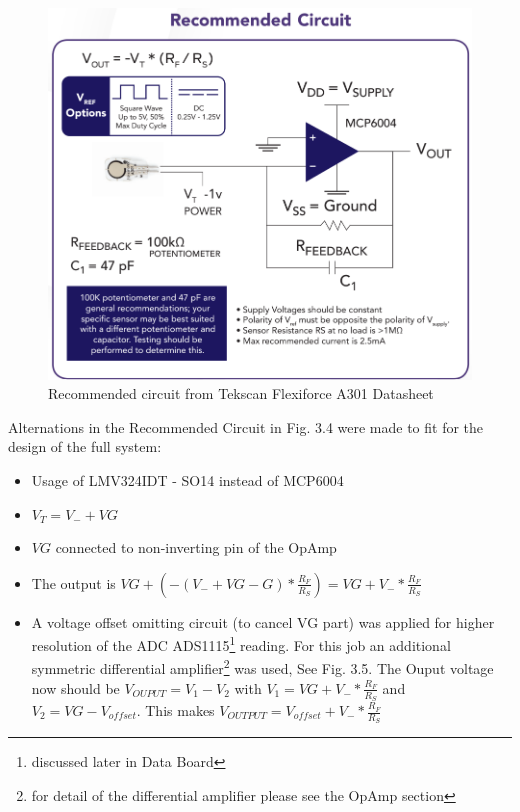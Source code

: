 \documentclass[12 pt, a4paper]{thesis}
\begin{document}
\begin{figure}[hbt!]
\begin{center}
\includegraphics[width = 150mm]{FlexA301Cir.png}
\end{center}
\caption{Recommended circuit from Tekscan Flexiforce A301 Datasheet}
\end{figure}
Alternations in the Recommended Circuit in Fig. 3.4 were made to fit for the design of the full system:
\begin{itemize}
\item{Usage of LMV324IDT - SO14 instead of MCP6004}
\item{$V_T = V_- + VG$}
\item{$VG$ connected to non-inverting pin of the OpAmp}
\item{The output is $VG+(-(V_- + VG - G)*\frac{R_F}{R_S})=VG+V_-*\frac{R_F}{R_S}$}
\item{A voltage offset omitting circuit (to cancel VG part) was applied for higher resolution of the ADC ADS1115\footnote{discussed later in Data Board} reading. For this job an additional symmetric differential amplifier\footnote{for detail of the differential amplifier please see the OpAmp section} was used, See Fig. 3.5. The Ouput voltage now should be $V_{OUPUT} = V_1-V_2$ with $V_1=VG+V_-*\frac{R_F}{R_S}$ and $V_2=VG-V_{offset}$. This makes $V_{OUTPUT}=V_{offset}+V_-*\frac{R_F}{R_S}$}
\end{itemize}
\end{document}
